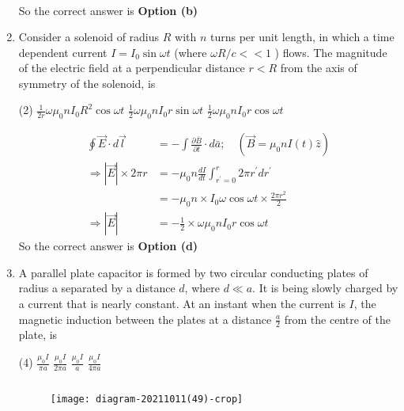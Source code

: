 \begin{enumerate}
\begin{answer}
\begin{align*}
	\end{align*}
	So the correct answer is \textbf{Option (b)}
\end{answer}
	\item Consider a solenoid of radius $R$ with $n$ turns per unit length, in which a time dependent current $I=I_{0} \sin \omega t$ (where $\omega R / c<<1$ ) flows. The magnitude of the electric field at a perpendicular distance $r<R$ from the axis of symmetry of the solenoid, is
	{}
	\begin{tasks}(2)
		\task[\textbf{b.}]$\frac{1}{2 r} \omega \mu_{0} n I_{0} R^{2} \cos \omega t$
		\task[\textbf{c.}]$\frac{1}{2} \omega \mu_{0} n I_{0} r \sin \omega t$
		\task[\textbf{d.}]  $\frac{1}{2} \omega \mu_{0} n I_{0} r \cos \omega t$
	\end{tasks}
\begin{answer}
	\begin{align*}
	\oint \vec{E} \cdot d \vec{l}&=-\int \frac{\partial \bar{B}}{\partial t} \cdot d \bar{a} ; \quad\left(\vec{B}=\mu_{0} n I(t) \hat{z}\right)\\
	\Rightarrow|\vec{E}| \times 2 \pi r&=-\mu_{0} n \frac{d I}{d t} \int_{r^{\prime}=0}^{r} 2 \pi r^{\prime} d r^{\prime}\\&=-\mu_{0} n \times I_{0} \omega \cos \omega t \times \frac{2 \pi r^{2}}{2}\\
	\Rightarrow|\vec{E}|&=-\frac{1}{2} \times \omega \mu_{0} n I_{0} r \cos \omega t
	\end{align*}
	So the correct answer is \textbf{Option (d)}
\end{answer}	
	\item A parallel plate capacitor is formed by two circular conducting plates of radius a separated by a distance $d$, where $d \ll a$. It is being slowly charged by a current that is nearly constant. At an instant when the current is $I$, the magnetic induction between the plates at a distance $\frac{a}{2}$ from the centre of the plate, is
	{}	
	\begin{tasks}(4)
		\task[\textbf{a.}]$\frac{\mu_{0} I}{\pi a}$
		\task[\textbf{b.}]$\frac{\mu_{0} I}{2 \pi a}$
		\task[\textbf{c.}]$\frac{\mu_{0} I}{a}$
		\task[\textbf{d.}]  $\frac{\mu_{0} I}{4 \pi a}$
	\end{tasks}	
\begin{answer}$\left. \right. $
	\begin{figure}[H]
		\centering
		\texttt{[image: diagram-20211011(49)-crop]}

\end{figure}
\end{answer}
\end{enumerate}
